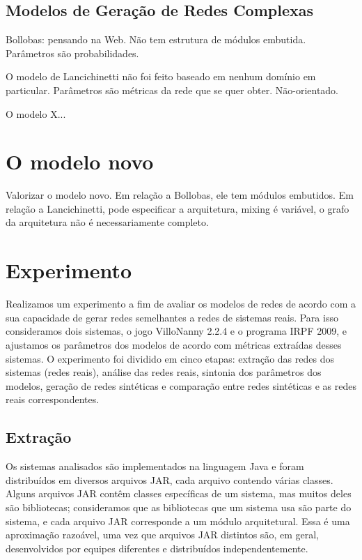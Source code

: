 \documentclass{acm_proc_article-sp}
\begin{document}
\subsection{Modelos de Geração de Redes Complexas}

Bollobas: pensando na Web. Não tem estrutura de módulos embutida. Parâmetros são probabilidades.

O modelo de Lancichinetti não foi feito baseado em nenhum domínio em particular. Parâmetros são métricas da rede que se quer obter. Não-orientado.

O modelo X...

\section{O modelo novo}

Valorizar o modelo novo. Em relação a Bollobas, ele tem módulos embutidos. Em relação a Lancichinetti, pode especificar a arquitetura, mixing é variável, o grafo da arquitetura não é necessariamente completo.

\section{Experimento} %

Realizamos um experimento a fim de avaliar os modelos de redes de acordo com a sua capacidade de gerar redes semelhantes a redes de sistemas reais. Para isso consideramos dois sistemas, o jogo VilloNanny 2.2.4 e o programa IRPF 2009, e ajustamos os parâmetros dos modelos de acordo com métricas extraídas desses sistemas. O experimento foi dividido em cinco etapas: extração das redes dos sistemas (redes reais), análise das redes reais, sintonia dos parâmetros dos modelos, geração de redes sintéticas e comparação entre redes sintéticas e as redes reais correspondentes. 


\subsection{Extração}

Os sistemas analisados são implementados na linguagem Java e foram distribuídos em diversos arquivos JAR, cada arquivo contendo várias classes. Alguns arquivos JAR contêm classes específicas de um sistema, mas muitos deles são bibliotecas; consideramos que as bibliotecas que um sistema usa são parte do sistema, e cada arquivo JAR corresponde a um módulo arquitetural. Essa é uma aproximação razoável, uma vez que arquivos JAR distintos são, em geral, desenvolvidos por equipes diferentes e distribuídos independentemente. 
\end{document}
